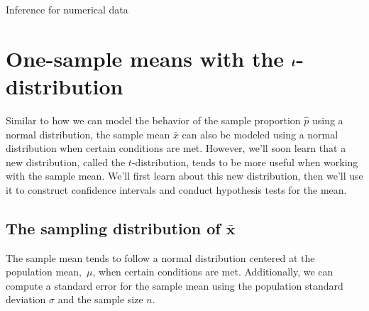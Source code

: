 \begin{chapterpage}{Inference for numerical data}
  \label{inferenceForNumericalData}
  \label{ch_inference_for_means}
\end{chapterpage}
\renewcommand{\chapterfolder}{ch_inference_for_means}





\section[One-sample means with the $t$-distribution]
    {One-sample means with the
        $\pmb{\MakeLowercase{t}}$-distribution}
\label{oneSampleMeansWithTDistribution}

\noindent%
Similar to how we can model the behavior of the
sample proportion $\hat{p}$ using a normal distribution,
the sample mean $\bar{x}$ can also be modeled using
a normal distribution when certain conditions are met.
However, we'll soon learn that a new distribution,
called the $t$-distribution,
tends to be more useful when working with the sample mean.
We'll first learn about this new distribution,
then we'll use it to construct confidence intervals
and conduct hypothesis tests for the mean.


\subsection[The distribution of $\bar{x}$]
    {The sampling distribution of $\pmb{\bar{x}}$}

The sample mean tends to follow
a normal distribution centered at the population mean,~$\mu$,
when certain conditions are met.
Additionally, we can compute a standard error for the sample
mean using the population standard deviation $\sigma$
and the sample size $n$.

